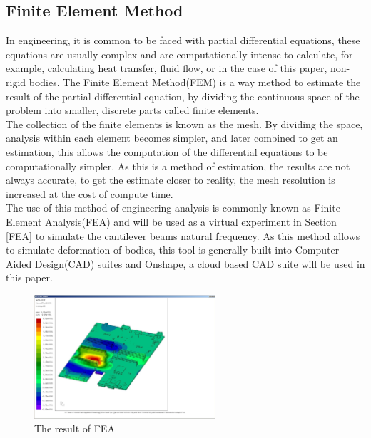 \documentclass[a4paper,12pt]{article}
\begin{document}
    \subsection{Finite Element Method}\label{FEM}%
    In engineering, it is common to be faced with partial differential equations, these equations are usually complex and are computationally intense to calculate, for example, calculating heat transfer, fluid flow, or in the case of this paper, non-rigid bodies.
    The Finite Element Method(FEM) is a way method to estimate the result of the partial differential equation, by dividing the continuous space of the problem into smaller, discrete parts called finite elements.\\
    The collection of the finite elements is known as the mesh. By dividing the space, analysis within each element becomes simpler, and later combined to get an estimation, this allows the computation of the differential equations to be computationally simpler. As this is a method of estimation, the results are not always accurate, to get the estimate closer to reality, the mesh resolution is increased at the cost of compute time.\autocite{FEABook} \\
    The use of this method of engineering analysis is commonly known as Finite Element Analysis(FEA) and will be used as a virtual experiment in Section \ref{FEA} to simulate the cantilever beams natural frequency.
    As this method allows to simulate deformation of bodies, this tool is generally built into Computer Aided Design(CAD) suites and Onshape, a cloud based CAD suite will be used in this paper.\\
    \begin{figure}[H]
    \includegraphics[width=0.6\textwidth]{feaexample}
    \centering
    \caption{The result of FEA\autocite{feaexample}}
    \centering
    \end{figure}
\end{document}
